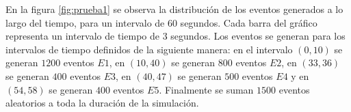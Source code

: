 \documentclass[a4paper,10pt, oneside]{article}
\begin{document}
En la figura \ref{fig:prueba1} se observa la distribución de los eventos generados a lo largo del tiempo, para un intervalo de 60 segundos. Cada barra del gráfico representa un intervalo de tiempo de $3$ segundos.
Los eventos se generan para los intervalos de tiempo definidos de la siguiente manera: en el intervalo $(0,10)$ se generan $1200$ eventos $E1$, en $(10,40)$ se generan $800$ eventos $E2$, en $(33,36)$ se generan $400$ eventos $E3$, en $(40,47)$ se generan $500$ eventos $E4$ y en $(54,58)$ se generan $400$ eventos $E5$. Finalmente se suman $1500$ eventos aleatorios a toda la duración de la simulación. 

\begin{figure}[bh]
	\centering
\end{figure}
\end{document}
